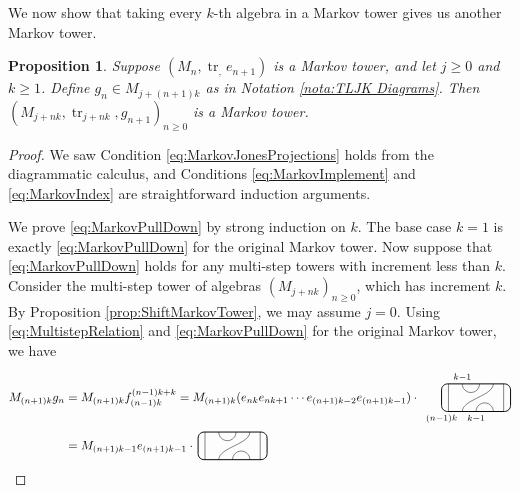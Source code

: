 \documentclass[11pt]{article}
\theoremstyle{plain}
\newtheorem{prop}[thm]{Proposition}
\theoremstyle{definition}
\DeclareMathOperator{\tr}{tr}
\begin{document}
We now show that taking every $k$-th algebra in a Markov tower gives us another Markov tower.

\begin{prop}
\label{prop:MultistepJonesProjections}
Suppose $(M_n, \tr_, e_{n+1})$ is a Markov tower, and let $j\geq 0$ and $k\geq 1$.
Define $g_n \in M_{j+(n+1)k}$ as in Notation \ref{nota:TLJK Diagrams}.
Then $(M_{j+nk}, \tr_{j+nk}, g_{n+1})_{n\geq 0}$ is a Markov tower.
\end{prop}
\begin{proof}
We saw Condition \ref{eq:MarkovJonesProjections} holds from the diagrammatic calculus, and Conditions \ref{eq:MarkovImplement} and \ref{eq:MarkovIndex} are straightforward induction arguments.

We prove \ref{eq:MarkovPullDown} by strong induction on $k$.
The base case $k=1$ is exactly \ref{eq:MarkovPullDown} for the original Markov tower.
Now suppose that \ref{eq:MarkovPullDown} holds for any multi-step towers with increment less than $k$.
Consider the multi-step tower of algebras $(M_{j+nk})_{n\geq 0}$, which has increment $k$.
By Proposition \ref{prop:ShiftMarkovTower}, we may assume $j=0$.
Using \eqref{eq:MultistepRelation} and \ref{eq:MarkovPullDown} for the original Markov tower, we have 
\begin{align*}
M_{(n+1)k} g_n 
&= 
M_{(n+1)k} f^{(n-1)k+k}_{(n-1)k} 
= 
M_{(n+1)k}
(e_{nk}e_{nk+1}\cdots e_{(n+1)k-2}e_{(n+1)k-1})
\cdot\,
\begin{tikzpicture}[baseline = .3cm]
	\draw[thick, rounded corners = 5pt] (0,0) rectangle (2,.8);
	\draw (.2,0) -- (.2,.8);
	\draw (1.8,0) -- (1.8,.8);
	\draw (.6,.8) arc (-180:0:.25cm);
	\draw (.6,0)  .. controls ++(90:.35cm) and ++(270:.35cm) .. (1.5,.8);
	\draw (1,0) arc (180:0:.25cm);
	\node at (.6,1) {\scriptsize{$k{-}1$}};
	\node at (1,-.2) {\scriptsize{$k{-}1$}};
	\node at (0,-.2) {\scriptsize{$(n{-}1)k$}};
\end{tikzpicture}
\\&=
M_{(n+1)k-1} 
e_{(n+1)k-1}
\cdot \,
\begin{tikzpicture}[baseline = .3cm]
	\draw[thick, rounded corners = 5pt] (0,0) rectangle (2,.8);
	\draw (.2,0) -- (.2,.8);
	\draw (1.8,0) -- (1.8,.8);
	\draw (.6,.8) arc (-180:0:.25cm);
	\draw (.6,0)  .. controls ++(90:.35cm) and ++(270:.35cm) .. (1.5,.8);
	\draw (1,0) arc (180:0:.25cm);

\end{tikzpicture}
\end{align*}
\end{proof}
\end{document}
